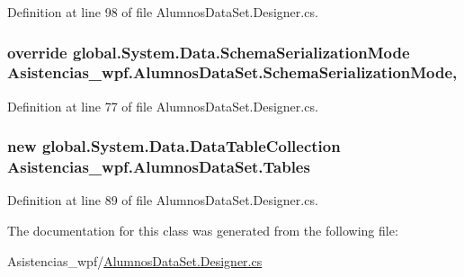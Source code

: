 Definition at line 98 of file Alumnos\-Data\-Set.\-Designer.\-cs.

\hypertarget{class_asistencias__wpf_1_1_alumnos_data_set_ac9d0957f5b0991168a77c1f48fb92941}{
\subsubsection[{Schema\-Serialization\-Mode}]{\setlength{\rightskip}{0pt plus 5cm}override global.\-System.\-Data.\-Schema\-Serialization\-Mode Asistencias\-\_\-wpf.\-Alumnos\-Data\-Set.\-Schema\-Serialization\-Mode\hspace{0.3cm}{\ttfamily [get]}, {\ttfamily [set]}}}\label{class_asistencias__wpf_1_1_alumnos_data_set_ac9d0957f5b0991168a77c1f48fb92941}


Definition at line 77 of file Alumnos\-Data\-Set.\-Designer.\-cs.

\hypertarget{class_asistencias__wpf_1_1_alumnos_data_set_aa4ac49198eb7a8cd5730501fd92eaa0c}{
\subsubsection[{Tables}]{\setlength{\rightskip}{0pt plus 5cm}new global.\-System.\-Data.\-Data\-Table\-Collection Asistencias\-\_\-wpf.\-Alumnos\-Data\-Set.\-Tables\hspace{0.3cm}{\ttfamily [get]}}}\label{class_asistencias__wpf_1_1_alumnos_data_set_aa4ac49198eb7a8cd5730501fd92eaa0c}


Definition at line 89 of file Alumnos\-Data\-Set.\-Designer.\-cs.



The documentation for this class was generated from the following file\-:\begin{DoxyCompactItemize}
\item 
Asistencias\-\_\-wpf/\hyperlink{_alumnos_data_set_8_designer_8cs}{Alumnos\-Data\-Set.\-Designer.\-cs}\end{DoxyCompactItemize}
